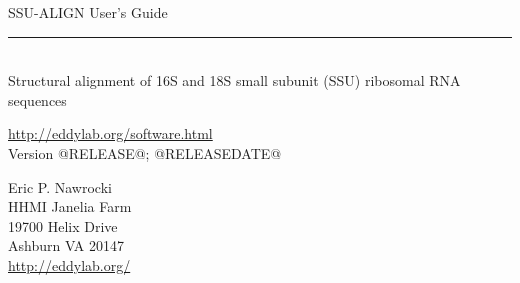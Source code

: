 \begin{titlepage}
{\Large

\vspace*{\fill}

\noindent
{\Huge \textsf{SSU-ALIGN User's Guide}} \\ 
\rule[2pt]{\textwidth}{1pt} \\
\hspace*{\fill} {\large \textsf{Structural alignment of 16S and 18S small subunit
    (SSU) ribosomal RNA sequences}\\}

\vspace*{\fill}

\begin{center}
\url{http://eddylab.org/software.html}\\
Version @RELEASE@; @RELEASEDATE@ \\ 

\vspace*{\fill}

Eric P. Nawrocki\\
HHMI Janelia Farm\\
19700 Helix Drive\\
Ashburn VA 20147\\
\url{http://eddylab.org/}
\end{center}

\vspace*{\fill}

}
\end{titlepage}
